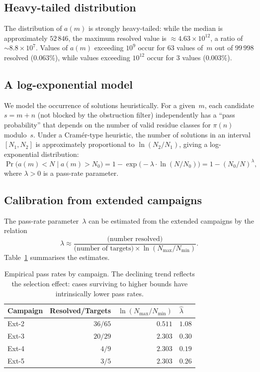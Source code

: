 \documentclass{amsart}
\theoremstyle{definition}
\theoremstyle{remark}
\numberwithin{equation}{section}
\begin{document}
\subsection{Heavy-tailed distribution}

The distribution of $a(m)$ is strongly heavy-tailed: while the
median is approximately $52\,846$, the maximum resolved value is
$\approx 4.63 \times 10^{12}$, a ratio of $\sim 8.8 \times 10^7$.
Values of $a(m)$ exceeding $10^9$ occur for $63$ values of~$m$
out of $99\,998$ resolved ($0.063\%$), while values exceeding
$10^{12}$ occur for $3$ values ($0.003\%$).

\subsection{A log-exponential model}

We model the occurrence of solutions heuristically.
For a given~$m$, each candidate $s = m + n$ (not blocked by the
obstruction filter) independently has a ``pass probability'' that
depends on the number of valid residue classes for $\pi(n)$
modulo~$s$.  Under a Cram\'er-type heuristic, the number of
solutions in an interval $[N_1, N_2]$ is approximately proportional
to $\ln(N_2/N_1)$, giving a log-exponential distribution:
\begin{equation}\label{eq:logexp}
\Pr\bigl(a(m) < N \mid a(m) > N_0\bigr)
= 1 - \exp\bigl(-\lambda \cdot \ln(N/N_0)\bigr)
= 1 - (N_0/N)^{\lambda},
\end{equation}
where $\lambda > 0$ is a pass-rate parameter.

\subsection{Calibration from extended campaigns}

The pass-rate parameter~$\lambda$ can be estimated from the
extended campaigns by the relation
\[
\lambda \approx
\frac{\text{(number resolved)}}
     {\text{(number of targets)} \times \ln(N_{\max}/N_{\min})}.
\]
Table~\ref{tab:passrate} summarises the estimates.

\begin{table}[ht]
\centering
\caption{Empirical pass rates by campaign.  The declining
trend reflects the selection effect: cases surviving to higher
bounds have intrinsically lower pass rates.}
\label{tab:passrate}
\begin{tabular}{lrrl}
\toprule
Campaign & Resolved/Targets & $\ln(N_{\max}/N_{\min})$ &
  $\hat\lambda$ \\
\midrule
Ext-2 & $36/65$  & $0.511$ & $1.08$ \\
Ext-3 & $20/29$  & $2.303$ & $0.30$ \\
Ext-4 & $4/9$    & $2.303$ & $0.19$ \\
Ext-5 & $3/5$    & $2.303$ & $0.26$ \\
\bottomrule
\end{tabular}
\end{table}
\end{document}
